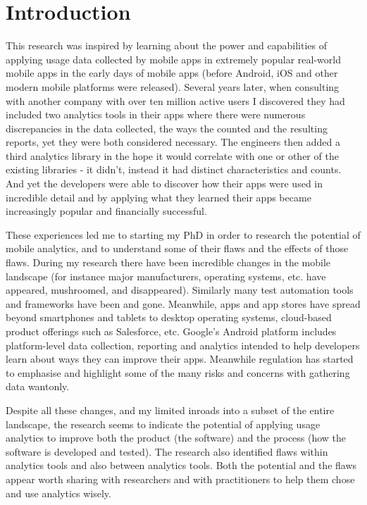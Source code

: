\chapter{Introduction}
This research was inspired by learning about the power and capabilities of applying usage data collected by mobile apps in extremely popular real-world mobile apps in the early days of mobile apps (before Android, iOS and other modern mobile platforms were released). 
Several years later, when consulting with another company with over ten million active users I discovered they had included two analytics tools in their apps where there were numerous discrepancies in the data collected, the ways the counted and the resulting reports, yet they were both considered necessary. The engineers then added a third analytics library in the hope it would correlate with one or other of the existing libraries - it didn't, instead it had distinct characteristics and counts. And yet the developers were able to discover how their apps were used in incredible detail and by applying what they learned their apps became increasingly popular and financially successful.

These experiences led me to starting my PhD in order to research the potential of mobile analytics, and to understand some of their flaws and the effects of those flaws. During my research there have been incredible changes in the mobile landscape (for instance major manufacturers, operating systems, etc. have appeared, mushroomed, and disappeared). Similarly many test automation tools and frameworks have been and gone. Meanwhile, apps and app stores have spread beyond smartphones and tablets to desktop operating systems, cloud-based product offerings such as Salesforce, etc. Google's Android platform includes platform-level data collection, reporting and analytics intended to help developers learn about ways they can improve their apps. Meanwhile regulation has started to emphasise and highlight some of the many risks and concerns with gathering data wantonly. 

Despite all these changes, and my limited inroads into a subset of the entire landscape, the research seems to indicate the potential of applying usage analytics to improve both the product (the software) and the process (how the software is developed and tested). The research also identified flaws within analytics tools and also between analytics tools. Both the potential and the flaws appear worth sharing with researchers and with practitioners to help them chose and use analytics wisely.

